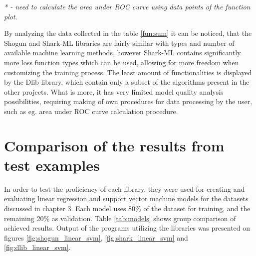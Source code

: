 \textit{* - need to calculate the area under ROC curve using data points of the function plot.}

By analyzing the data collected in the table \ref{fun:sum} it can be noticed, that the Shogun and Shark-ML libraries are fairly similar with types and number of available machine learning methods, however Shark-ML contains significantly more loss function types which can be used, allowing for more freedom when customizing the training process. The least amount of functionalities is displayed by the Dlib library, which contain only a subset of the algorithms present in the other projects. What is more, it has very limited model quality analysis possibilities, requiring making of own procedures for data processing by the user, such as eg. area under ROC curve calculation procedure.

\section{Comparison of the results from test examples}

In order to test the proficiency of each library, they were used for creating and evaluating linear regression and support vector machine models for the datasets discussed in chapter 3. Each model uses 80\% of the dataset for training, and the remaining 20\% as validation. Table \ref{tab:models} shows group comparison of achieved results. Output of the programs utilizing the libraries was presented on figures \ref{fig:shogun_linear_svm}, \ref{fig:shark_linear_svm} and \ref{fig:dlib_linear_svm}.

